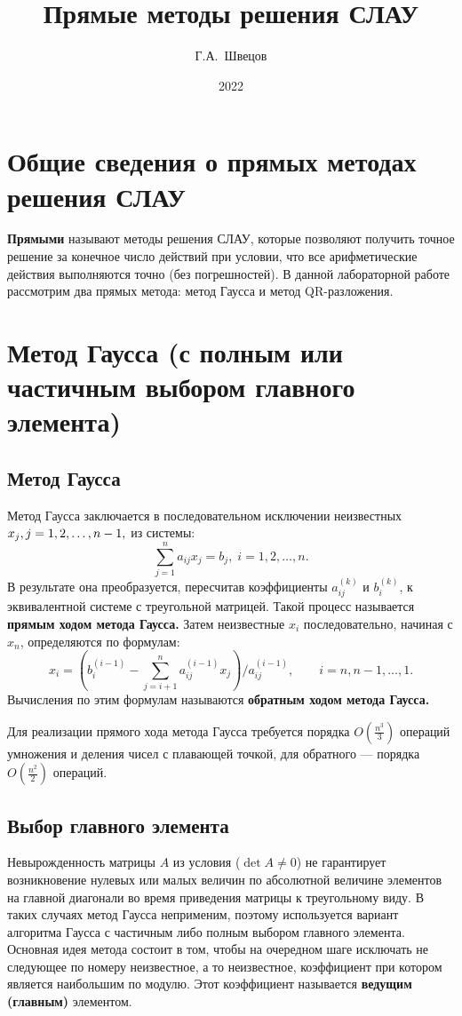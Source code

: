 \documentclass[12pt, a4paper]{article}
\title{Прямые методы решения СЛАУ}
\author{Г.А.~Швецов}
\date{2022}
\begin{document}
	\newcommand{\pl}{\partial}
	\maketitle
	
	\tableofcontents
	
	\newpage
	\section{Общие сведения о прямых методах решения СЛАУ}
	\textbf{Прямыми} называют методы решения СЛАУ, которые позволяют получить точное решение за конечное число действий при
	условии, что все арифметические действия выполняются точно (без погрешностей).
	В данной лабораторной работе рассмотрим два прямых метода:
	метод Гаусса и метод QR-разложения.
	\section{Метод Гаусса (с полным или частичным выбором главного элемента)}
	\subsection{Метод Гаусса}
	Метод Гаусса заключается в последовательном исключении неизвестных $x_j,\\j=1,2,\dots,n-1,$ из системы:
	\[
	\sum_{j=1}^n a_{ij}x_j=b_j,\;	
	i=1,2,\dots,n.		
	\]
	В результате она преобразуется, пересчитав коэффициенты $a_{ij}^{(k)}$ и $b_i^{(k)}$, к эквивалентной системе с треугольной матрицей. Такой процесс называется \textbf{прямым ходом метода Гаусса.}
	Затем неизвестные $x_i$ последовательно, начиная с $x_n$, определяются по формулам:
	\[
	x_i=\left(b_i^{(i-1)}-\sum_{j=i+1}^n a_{ij}^{(i-1)}x_j\right)/a_{ij}^{(i-1)},\qquad i=n,n-1,\dots,1.
	\]
	Вычисления по этим формулам называются \textbf{обратным ходом метода Гаусса.}
	
	Для реализации прямого хода метода Гаусса требуется порядка $O(\frac{n^3}{3})$ операций умножения и деления чисел с плавающей точкой, для обратного — порядка $O(\frac{n^2}{2})$ операций.
	\subsection{Выбор главного элемента}
	Невырожденность матрицы $A$ из условия ($\det A \ne 0$) не гарантирует возникновение нулевых или малых величин по абсолютной величине элементов на главной диагонали во время приведения матрицы к треугольному виду. В таких случаях метод Гаусса неприменим, поэтому используется вариант алгоритма Гаусса с частичным либо полным выбором главного элемента. Основная идея метода состоит в том, чтобы на очередном шаге исключать не следующее по номеру неизвестное, а то
	неизвестное, коэффициент при котором является наибольшим по
	модулю. Этот коэффициент называется \textbf{ведущим (главным)} элементом.
	
\end{document}
